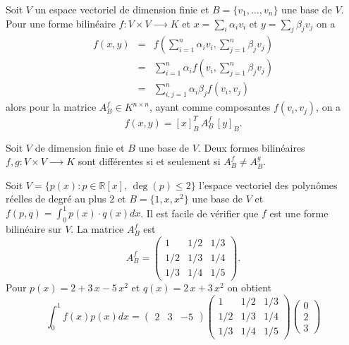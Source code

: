 Soit $V$ un espace vectoriel de dimension finie et $B = \{v_1,\dots,v_n\}$ une base de $V$. Pour une forme bilinéaire $f: V × V ⟶ K$ 
 et $x = \sum_i\alpha_i v_i$ et $y = \sum_j \beta_j v_j$ on a 
 \begin{eqnarray*}
   f(x,y) & = & f \left( ∑_{i=1}^n \alpha_i v_i ,   ∑_{j=1}^n \beta_j v_j \right) \\
          & = & ∑_{i=1}^n \alpha_i f \left(  v_i ,   ∑_{j=1}^n \beta_j v_j \right) \\
          & = & ∑_{i,j=1}^n \alpha_i β_j f (  v_i ,  v_j )
    \end{eqnarray*}
alors pour la matrice $A_B^f \in K^{n\times n}$, ayant comme composantes $f(v_i,v_j)$, on a 
\begin{displaymath}
  f(x,y) = [x]_B^T \,A_B^f \,  [y]_B. 
\end{displaymath}
\begin{exercise} Soit $V$ de dimension finie et $B$ une base de $V$. 
  Deux formes bilinéaires $f,g : V × V ⟶ K$
  sont différentes si et seulement si $A_B^f \neq A_B^g$. 
\end{exercise}


\begin{example}
  \label{exe:9}
  Soit $V = \{ p(x) : p ∈ ℝ[x], \, \deg(p)≤ 2\}$ l'espace vectoriel des polynômes réelles de degré au plus $2$ et $B = \{ 1,x,x^2\}$ une base de $V$ et $f(p,q) = \int_0^1 p(x) ⋅ q(x) dx$. Il est facile de vérifier que $f$ est une forme bilinéaire sur $V$. La matrice $A_B^f$ est 
  \begin{displaymath}
    A_B^f =
    \begin{pmatrix}
      1 & 1/2 & 1/3 \\
      1/2 & 1/3 & 1/4\\
      1/3 & 1/4 & 1/5
    \end{pmatrix}. 
  \end{displaymath}
 Pour $p(x) = 2+3\,x - 5\,x^2$ et $q(x) = 2\,x + 3\,x^2$ on obtient 
 \begin{displaymath}
   \int_0^1 f(x) p(x) dx =
   \begin{pmatrix}
     2 & 3 & -5
   \end{pmatrix}
 \begin{pmatrix}
      1 & 1/2 & 1/3 \\
      1/2 & 1/3 & 1/4\\
      1/3 & 1/4 & 1/5
    \end{pmatrix}
   \begin{pmatrix}
     0\\2\\3
   \end{pmatrix}
 \end{displaymath}
\end{example}


